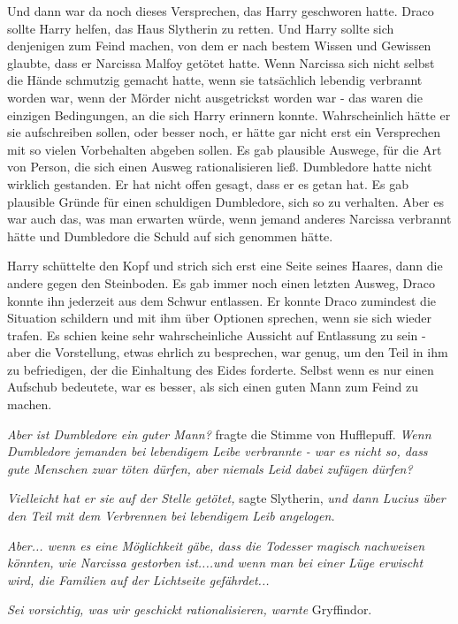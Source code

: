 Und dann war da noch dieses Versprechen, das Harry geschworen hatte. Draco
sollte Harry helfen, das Haus Slytherin zu retten. Und Harry sollte sich
denjenigen zum Feind machen, von dem er nach bestem Wissen und Gewissen glaubte,
dass er Narcissa Malfoy getötet hatte. Wenn Narcissa sich nicht selbst die Hände
schmutzig gemacht hatte, wenn sie tatsächlich lebendig verbrannt worden war,
wenn der Mörder nicht ausgetrickst worden war - das waren die einzigen
Bedingungen, an die sich Harry erinnern konnte. Wahrscheinlich hätte er sie
aufschreiben sollen, oder besser noch, er hätte gar nicht erst ein Versprechen
mit so vielen Vorbehalten abgeben sollen. Es gab plausible Auswege, für die Art
von Person, die sich einen Ausweg rationalisieren ließ. Dumbledore hatte nicht
wirklich gestanden. Er hat nicht offen gesagt, dass er es getan hat. Es gab
plausible Gründe für einen schuldigen Dumbledore, sich so zu verhalten. Aber es
war auch das, was man erwarten würde, wenn jemand anderes Narcissa verbrannt
hätte und Dumbledore die Schuld auf sich genommen hätte.

Harry schüttelte den Kopf und strich sich erst eine Seite seines Haares, dann
die andere gegen den Steinboden. Es gab immer noch einen letzten Ausweg, Draco
konnte ihn jederzeit aus dem Schwur entlassen. Er konnte Draco zumindest die
Situation schildern und mit ihm über Optionen sprechen, wenn sie sich wieder
trafen. Es schien keine sehr wahrscheinliche Aussicht auf Entlassung zu sein -
aber die Vorstellung, etwas ehrlich zu besprechen, war genug, um den Teil in ihm
zu befriedigen, der die Einhaltung des Eides forderte. Selbst wenn es nur einen
Aufschub bedeutete, war es besser, als sich einen guten Mann zum Feind zu
machen.

\emph{Aber ist Dumbledore ein guter Mann?} fragte die Stimme von Hufflepuff.
\emph{Wenn Dumbledore jemanden bei lebendigem Leibe verbrannte - war es nicht
so, dass gute Menschen zwar töten dürfen, aber niemals Leid dabei zufügen
dürfen? }

\emph{Vielleicht hat er sie auf der Stelle getötet,} sagte Slytherin, \emph{und
dann Lucius über den Teil mit dem Verbrennen bei lebendigem Leib angelogen. }

\emph{Aber... wenn es eine Möglichkeit gäbe, dass die Todesser magisch nachweisen könnten, wie Narcissa gestorben ist....und wenn man bei einer Lüge erwischt wird, die Familien auf der Lichtseite gefährdet... }

\emph{Sei vorsichtig, was wir geschickt rationalisieren, warnte} Gryffindor.

